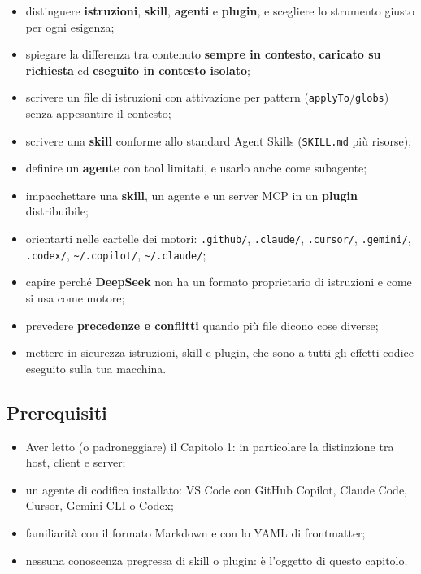 \documentclass[
  italian,
  10pt,
]{book}
\providecommand{\tightlist}{%
  \setlength{\itemsep}{0pt}\setlength{\parskip}{0pt}}
\begin{document}
\begin{itemize}
\tightlist
\item
  distinguere \textbf{istruzioni}, \textbf{skill}, \textbf{agenti} e
  \textbf{plugin}, e scegliere lo strumento giusto per ogni esigenza;
\item
  spiegare la differenza tra contenuto \textbf{sempre in contesto},
  \textbf{caricato su richiesta} ed \textbf{eseguito in contesto
  isolato};
\item
  scrivere un file di istruzioni con attivazione per pattern
  (\texttt{applyTo}/\texttt{globs}) senza appesantire il contesto;
\item
  scrivere una \textbf{skill} conforme allo standard Agent Skills
  (\texttt{SKILL.md} più risorse);
\item
  definire un \textbf{agente} con tool limitati, e usarlo anche come
  subagente;
\item
  impacchettare una \textbf{skill}, un agente e un server MCP in un
  \textbf{plugin} distribuibile;
\item
  orientarti nelle cartelle dei motori: \texttt{.github/},
  \texttt{.claude/}, \texttt{.cursor/}, \texttt{.gemini/},
  \texttt{.codex/}, \texttt{\textasciitilde{}/.copilot/},
  \texttt{\textasciitilde{}/.claude/};
\item
  capire perché \textbf{DeepSeek} non ha un formato proprietario di
  istruzioni e come si usa come motore;
\item
  prevedere \textbf{precedenze e conflitti} quando più file dicono cose
  diverse;
\item
  mettere in sicurezza istruzioni, skill e plugin, che sono a tutti gli
  effetti codice eseguito sulla tua macchina.
\end{itemize}

\subsection{Prerequisiti}\label{prerequisiti-3}

\begin{itemize}
\tightlist
\item
  Aver letto (o padroneggiare) il Capitolo 1: in particolare la
  distinzione tra host, client e server;
\item
  un agente di codifica installato: VS Code con GitHub Copilot, Claude
  Code, Cursor, Gemini CLI o Codex;
\item
  familiarità con il formato Markdown e con lo YAML di frontmatter;
\item
  nessuna conoscenza pregressa di skill o plugin: è l'oggetto di questo
  capitolo.
\end{itemize}
\end{document}
